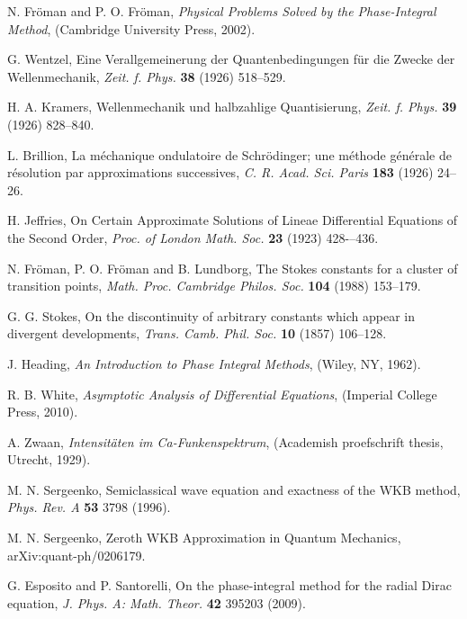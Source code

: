 \documentclass[asy]{iosart2x}
\begin{document}

\begin{thebibliography}{30}

 N. Fr\"oman and P. O. Fr\"oman, 
\textit{Physical Problems Solved by the Phase-Integral Method}, 
(Cambridge University Press, 2002).

 G. Wentzel, 
Eine Verallgemeinerung der Quantenbedingungen f\"ur die Zwecke der Wellenmechanik,
\textit{Zeit. f. Phys.} \textbf{38} (1926) 518--529.

 H. A. Kramers, 
Wellenmechanik und halbzahlige Quantisierung,
\textit{Zeit. f. Phys.} \textbf{39} (1926) 828--840.

 L. Brillion, 
La m\'echanique ondulatoire de Schr\"odinger; une m\'ethode
g\'en\'erale de r\'esolution par approximations successives,
\textit{C. R. Acad. Sci. Paris} \textbf{183} (1926) 24--26.

 H. Jeffries, 
On Certain Approximate Solutions of Lineae Differential Equations of the Second Order,
\textit{Proc. of London Math. Soc.} \textbf{23} (1923) 428-–436.

 N. Fr\"oman, P. O. Fr\"oman and B. Lundborg,
The Stokes constants for a cluster of transition points,
\textit{Math. Proc. Cambridge Philos. Soc.} \textbf{104} (1988) 153--179.

 G. G. Stokes, 
On the discontinuity of arbitrary constants which appear in divergent developments,
\textit{Trans. Camb. Phil. Soc.} \textbf{10} (1857) 106--128.

 J. Heading, 
\textit{An Introduction to Phase Integral Methods}, 
(Wiley, NY, 1962).

 R. B. White, 
\textit{Asymptotic Analysis of Differential Equations}, 
(Imperial College Press, 2010).

 A. Zwaan, 
\textit{Intensit\"aten im Ca-Funkenspektrum}, 
(Academish proefschrift thesis, Utrecht, 1929).

 M. N. Sergeenko,
Semiclassical wave equation and exactness of the WKB method,
\textit{Phys. Rev. A} \textbf{53} 3798 (1996).

 M. N. Sergeenko, 
Zeroth WKB Approximation in Quantum Mechanics,
arXiv:quant-ph/0206179.

 G. Esposito and P. Santorelli, 
On the phase-integral method for the radial Dirac equation,
\textit{J. Phys. A: Math. Theor.} \textbf{42} 395203 (2009).


\end{thebibliography}
\end{document}
